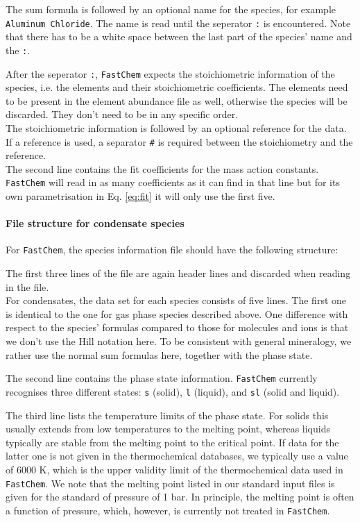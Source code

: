\documentclass[numbers=noenddot]{aux/fcmanual}
\newcommand{\fc}{\texttt{FastChem}\xspace}
\begin{document}
The sum formula is followed by an optional name for the species, for example \verb|Aluminum Chloride|. The name is read until the seperator \verb|:| is encountered. Note that there has to be a white space between the last part of the species' name and the \verb|:|.

After the seperator \verb|:|, \fc expects the stoichiometric information of the species, i.e. the elements and their stoichiometric coefficients. The elements need to be present in the element abundance file as well, otherwise the species will be discarded. They don't need to be in any specific order.\\
The stoichiometric information is followed by an optional reference for the data. If a reference is used, a separator \verb|#| is required between the stoichiometry and the reference.\\

The second line contains the fit coefficients for the mass action constants. \fc will read in as many coefficients as it can find in that line but for its own parametrisation in Eq. \eqref{eq:fit} it will only use the first five.


\paragraph{File structure for condensate species}
For \fc, the species information file should have the following structure:

The first three lines of the file are again header lines and discarded when reading in the file. \\

For condensates, the data set for each species consists of five lines. The first one is identical to the one for gas phase species described above. One difference with respect to the species' formulas compared to those for molecules and ions is that we don't use the Hill notation here. To be consistent with general mineralogy, we rather use the normal sum formulas here, together with the phase state. 

The second line contains the phase state information. \fc currently recognises three different states:  \verb|s| (solid),  \verb|l| (liquid), and  \verb|sl| (solid and liquid).

The third line lists the temperature limits of the phase state. For solids this usually extends from low temperatures to the melting point, whereas liquids typically are stable from the melting point to the critical point. If data for the latter one is not given in the thermochemical databases, we typically use a value of 6000 K, which is the upper validity limit of the thermochemical data used in \fc. We note that the melting point listed in our standard input files is given for the standard of pressure of 1 bar. In principle, the melting point is often a function of pressure, which, however, is currently not treated in \fc.
\end{document}

